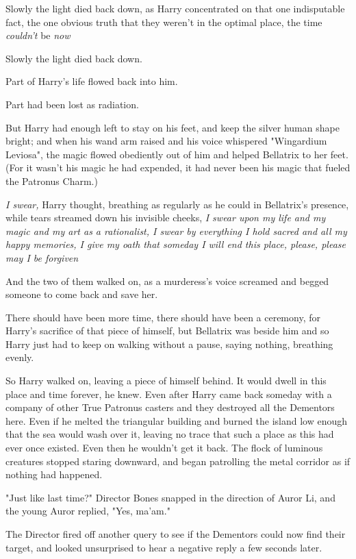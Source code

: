 Slowly the light died back down, as Harry concentrated on that one indisputable
fact, the one obvious truth that they weren't in the optimal place, the time
\emph{couldn't} be \emph{now{\el}}

Slowly the light died back down.

Part of Harry's life flowed back into him.

Part had been lost as radiation.

But Harry had enough left to stay on his feet, and keep the silver human shape
bright; and when his wand arm raised and his voice whispered "Wingardium
Leviosa", the magic flowed obediently out of him and helped Bellatrix to her
feet. (For it wasn't his magic he had expended, it had never been his magic
that fueled the Patronus Charm.)

\emph{I swear,} Harry thought, breathing as regularly as he could in
Bellatrix's presence, while tears streamed down his invisible cheeks, \emph{I
swear upon my life and my magic and my art as a rationalist, I swear by
everything I hold sacred and all my happy memories, I give my oath that someday
I will end this place, please, please may I be forgiven{\el}}

And the two of them walked on, as a murderess's voice screamed and begged
someone to come back and save her.

There should have been more time, there should have been a ceremony, for
Harry's sacrifice of that piece of himself, but Bellatrix was beside him and so
Harry just had to keep on walking without a pause, saying nothing, breathing
evenly.

So Harry walked on, leaving a piece of himself behind. It would dwell in this
place and time forever, he knew. Even after Harry came back someday with a
company of other True Patronus casters and they destroyed all the Dementors
here. Even if he melted the triangular building and burned the island low
enough that the sea would wash over it, leaving no trace that such a place as
this had ever once existed. Even then he wouldn't get it back.
\sbreak
The flock of luminous creatures stopped staring downward, and began patrolling
the metal corridor as if nothing had happened.

"Just like last time?" Director Bones snapped in the direction of Auror Li, and
the young Auror replied, "Yes, ma'am."

The Director fired off another query to see if the Dementors could now find
their target, and looked unsurprised to hear a negative reply a few seconds
later.


